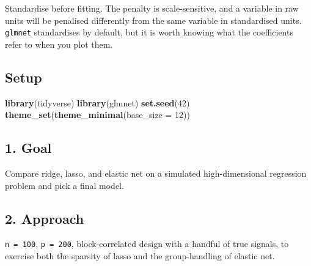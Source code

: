 \documentclass[
]{article}
\newenvironment{Shaded}{\begin{snugshade}}{\end{snugshade}}
\newcommand{\AttributeTok}[1]{\textcolor[rgb]{0.13,0.29,0.53}{#1}}
\newcommand{\DecValTok}[1]{\textcolor[rgb]{0.00,0.00,0.81}{#1}}
\newcommand{\FunctionTok}[1]{\textcolor[rgb]{0.13,0.29,0.53}{\textbf{#1}}}
\newcommand{\NormalTok}[1]{#1}
\begin{document}
Standardise before fitting. The penalty is scale-sensitive, and a
variable in raw units will be penalised differently from the same
variable in standardised units. \texttt{glmnet} standardises by default,
but it is worth knowing what the coefficients refer to when you plot
them.

\subsection{Setup}\label{setup}

\begin{Shaded}
\begin{Highlighting}[]
\FunctionTok{library}\NormalTok{(tidyverse)}
\FunctionTok{library}\NormalTok{(glmnet)}
\FunctionTok{set.seed}\NormalTok{(}\DecValTok{42}\NormalTok{)}
\FunctionTok{theme\_set}\NormalTok{(}\FunctionTok{theme\_minimal}\NormalTok{(}\AttributeTok{base\_size =} \DecValTok{12}\NormalTok{))}
\end{Highlighting}
\end{Shaded}

\subsection{1. Goal}\label{goal}

Compare ridge, lasso, and elastic net on a simulated high-dimensional
regression problem and pick a final model.

\subsection{2. Approach}\label{approach}

\texttt{n\ =\ 100}, \texttt{p\ =\ 200}, block-correlated design with a
handful of true signals, to exercise both the sparsity of lasso and the
group-handling of elastic net.
\end{document}
